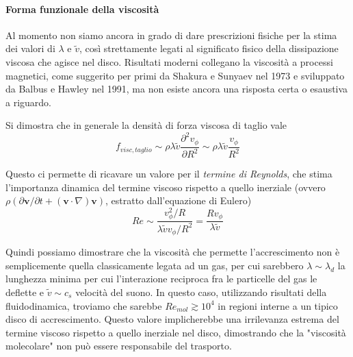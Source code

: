 \documentclass[a4paperbi]{article}
\begin{document}
	\paragraph{Forma funzionale della viscosità}	
	Al momento non siamo ancora in grado di dare prescrizioni fisiche per la stima dei valori di $\lambda$ e $\tilde{v}$, così strettamente legati al significato fisico della dissipazione viscosa che agisce nel disco. Risultati moderni collegano la viscosità a processi magnetici, come suggerito per primi da Shakura e Sunyaev nel 1973 e sviluppato da Balbus e Hawley nel 1991, ma non esiste ancora una risposta certa o esaustiva a riguardo. 
	
	Si dimostra che in generale la densità di forza viscosa di taglio vale
	\begin{equation}
		f_{visc,taglio}\sim\rho\lambda\tilde{v}\frac{\partial^2v_\phi}{\partial R^2}\sim\rho\lambda\tilde{v}\frac{v_\phi}{R^2}
	\end{equation}

	Questo ci permette di ricavare un valore per il \textit{termine di Reynolds}, che stima l'importanza dinamica del termine viscoso rispetto a quello inerziale (ovvero $\rho(\partial\textbf{v}/\partial t+(\textbf{v}\cdot\nabla)\textbf{v})$, estratto dall'equazione di Eulero)
	\begin{equation}
		Re\sim\frac{v_\phi^2/R}{\lambda\tilde{v}v_\phi/R^2}=\frac{Rv_\phi}{\lambda\tilde{v}}
	\end{equation}
	
	Quindi possiamo dimostrare che la viscosità che permette l'accrescimento non è semplicemente quella classicamente legata ad un gas, per cui sarebbero $\lambda\sim\lambda_d$ la lunghezza minima per cui l'interazione reciproca fra le particelle del gas le deflette e $\tilde{v}\sim c_s$ velocità del suono. In questo caso, utilizzando risultati della fluidodinamica, troviamo che sarebbe $Re_{mol}\gtrsim10^4$ in regioni interne a un tipico disco di accrescimento. Questo valore implicherebbe una irrilevanza estrema del termine viscoso rispetto a quello inerziale nel disco, dimostrando che la "viscosità molecolare" non può essere responsabile del trasporto.
	
\end{document}
